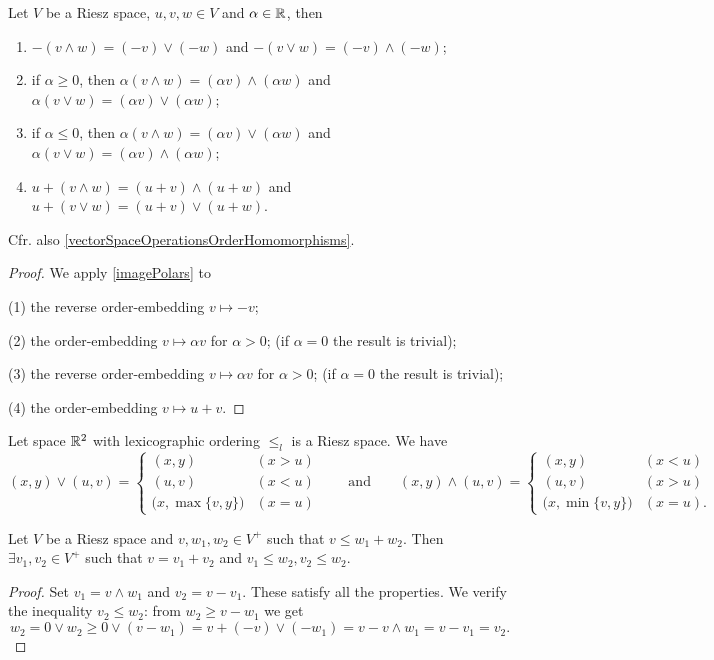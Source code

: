 \begin{lemma} \label{lemmaRieszSpaces}
Let $V$ be a Riesz space, $u,v,w\in V$ and $\alpha\in \mathbb{R}$, then
\begin{enumerate}
\item $-(v \wedge w) = (-v)\vee (-w)$ and $-(v \vee w) = (-v)\wedge (-w)$;
\item if $\alpha \geq 0$, then $\alpha(v \wedge w) = (\alpha v)\wedge (\alpha w)$ and $\alpha(v \vee w) = (\alpha v)\vee (\alpha w)$;
\item if $\alpha \leq 0$, then $\alpha(v \wedge w) = (\alpha v)\vee (\alpha w)$ and $\alpha(v \vee w) = (\alpha v)\wedge (\alpha w)$;
\item $u+(v \wedge w) = (u+v)\wedge (u+w)$ and $u+(v \vee w) = (u+v)\vee (u+w)$.
\end{enumerate}
\end{lemma}
Cfr. also \ref{vectorSpaceOperationsOrderHomomorphisms}.
\begin{proof}
We apply \ref{imagePolars} to

(1) the reverse order-embedding $v\mapsto -v$;

(2) the order-embedding $v\mapsto \alpha v$ for $\alpha > 0$; (if $\alpha = 0$ the result is trivial);

(3) the reverse order-embedding $v\mapsto \alpha v$ for $\alpha > 0$; (if $\alpha = 0$ the result is trivial);

(4) the order-embedding $v\mapsto u+v$.
\end{proof}

\begin{example}
Let space $\mathbb{R}^2$ with lexicographic ordering $\leq_l$ is a Riesz space. We have
\[ (x,y)\vee (u,v) = \begin{cases}
(x,y) & (x>u) \\ (u,v) & (x<u) \\ \big(x, \max\{v,y\}\big) & (x = u)
\end{cases} \qquad\text{and}\qquad (x,y)\wedge (u,v) = \begin{cases}
(x,y) & (x<u) \\ (u,v) & (x>u) \\ \big(x, \min\{v,y\}\big) & (x = u).
\end{cases} \]
\end{example}

\begin{theorem} \label{RieszDecomposition}
Let $V$ be a Riesz space and $v,w_1,w_2\in V^+$ such that $v \leq w_1 + w_2$. Then $\exists v_1, v_2\in V^+$ such that $v = v_1 + v_2$ and $v_1 \leq w_2, v_2 \leq w_2$.
\end{theorem}
\begin{proof}
Set $v_1 = v\wedge w_1$ and $v_2 = v - v_1$. These satisfy all the properties. We verify the inequality $v_2 \leq w_2$: from $w_2 \geq v - w_1$ we get
\[ w_2 = 0\vee w_2 \geq 0\vee (v - w_1) = v + (-v)\vee(-w_1) = v - v\wedge w_1 = v-v_1 = v_2. \]
\end{proof}

